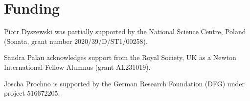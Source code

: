 \documentclass[a4,12pt]{amsart}
\numberwithin{equation}{section}
\begin{document}
\section*{Funding}
Piotr Dyszewski was partially supported by the National Science Centre, Poland (Sonata, grant
number 2020/39/D/ST1/00258). 

Sandra Palau acknowledges support from the Royal Society, UK as a Newton International Fellow Alumnus (grant AL231019). 

Joscha Prochno is supported by the German Research Foundation (DFG) under project 516672205.

 

\end{document}
